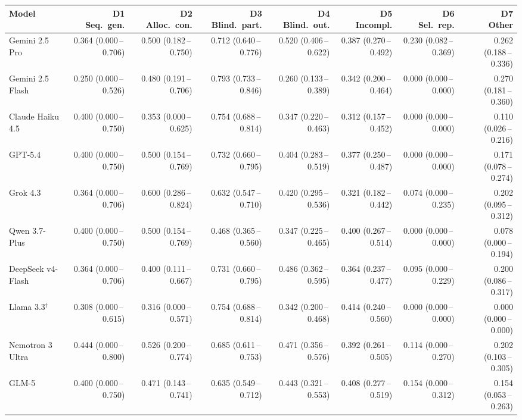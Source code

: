 \begin{tabular}{lrrrrrrr}
\toprule
Model & \makecell{D1\\Seq.\ gen.} & \makecell{D2\\Alloc.\ con.} & \makecell{D3\\Blind.\ part.} & \makecell{D4\\Blind.\ out.} & \makecell{D5\\Incompl.} & \makecell{D6\\Sel.\ rep.} & \makecell{D7\\Other} \\
\midrule
Gemini 2.5 Pro & 0.364 (0.000\,--\,0.706) & 0.500 (0.182\,--\,0.750) & 0.712 (0.640\,--\,0.776) & 0.520 (0.406\,--\,0.622) & 0.387 (0.270\,--\,0.492) & 0.230 (0.082\,--\,0.369) & 0.262 (0.188\,--\,0.336) \\
Gemini 2.5 Flash & 0.250 (0.000\,--\,0.526) & 0.480 (0.191\,--\,0.706) & 0.793 (0.733\,--\,0.846) & 0.260 (0.133\,--\,0.389) & 0.342 (0.200\,--\,0.464) & 0.000 (0.000\,--\,0.000) & 0.270 (0.181\,--\,0.360) \\
Claude Haiku 4.5 & 0.400 (0.000\,--\,0.750) & 0.353 (0.000\,--\,0.625) & 0.754 (0.688\,--\,0.814) & 0.347 (0.220\,--\,0.463) & 0.312 (0.157\,--\,0.452) & 0.000 (0.000\,--\,0.000) & 0.110 (0.026\,--\,0.216) \\
GPT-5.4 & 0.400 (0.000\,--\,0.750) & 0.500 (0.154\,--\,0.769) & 0.732 (0.660\,--\,0.795) & 0.404 (0.283\,--\,0.519) & 0.377 (0.250\,--\,0.487) & 0.000 (0.000\,--\,0.000) & 0.171 (0.078\,--\,0.274) \\
Grok 4.3 & 0.364 (0.000\,--\,0.706) & 0.600 (0.286\,--\,0.824) & 0.632 (0.547\,--\,0.710) & 0.420 (0.295\,--\,0.536) & 0.321 (0.182\,--\,0.442) & 0.074 (0.000\,--\,0.235) & 0.202 (0.095\,--\,0.312) \\
Qwen 3.7-Plus & 0.400 (0.000\,--\,0.750) & 0.500 (0.154\,--\,0.769) & 0.468 (0.365\,--\,0.560) & 0.347 (0.225\,--\,0.465) & 0.400 (0.267\,--\,0.514) & 0.000 (0.000\,--\,0.000) & 0.078 (0.000\,--\,0.194) \\
DeepSeek v4-Flash & 0.364 (0.000\,--\,0.706) & 0.400 (0.111\,--\,0.667) & 0.731 (0.660\,--\,0.795) & 0.486 (0.362\,--\,0.595) & 0.364 (0.237\,--\,0.477) & 0.095 (0.000\,--\,0.229) & 0.200 (0.086\,--\,0.317) \\
Llama 3.3$^\dagger$ & 0.308 (0.000\,--\,0.615) & 0.316 (0.000\,--\,0.571) & 0.754 (0.688\,--\,0.814) & 0.342 (0.200\,--\,0.468) & 0.414 (0.240\,--\,0.560) & 0.000 (0.000\,--\,0.000) & 0.000 (0.000\,--\,0.000) \\
Nemotron 3 Ultra & 0.444 (0.000\,--\,0.800) & 0.526 (0.200\,--\,0.774) & 0.685 (0.611\,--\,0.753) & 0.471 (0.356\,--\,0.576) & 0.392 (0.261\,--\,0.505) & 0.114 (0.000\,--\,0.270) & 0.202 (0.103\,--\,0.305) \\
GLM-5 & 0.400 (0.000\,--\,0.750) & 0.471 (0.143\,--\,0.741) & 0.635 (0.549\,--\,0.712) & 0.443 (0.321\,--\,0.553) & 0.408 (0.277\,--\,0.519) & 0.154 (0.000\,--\,0.312) & 0.154 (0.053\,--\,0.263) \\
\bottomrule
\end{tabular}